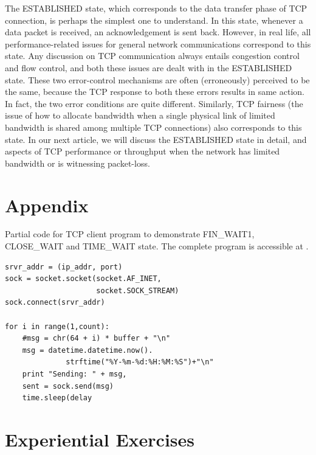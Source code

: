 \begin{multicols}{2}
The ESTABLISHED state, which corresponds to the data transfer phase of TCP connection, is perhaps the simplest one to understand. In this state, whenever a data packet is received, an acknowledgement is sent back. However, in real life, all performance-related issues for general network communications correspond to this state. Any discussion on TCP communication always entails congestion control and flow control, and both these issues are dealt with in the ESTABLISHED state. These two error-control mechanisms are often (erroneously) perceived to be the same, because the TCP response to both these errors results in same action. In fact, the two error conditions are quite different. Similarly, TCP fairness (the issue of how to allocate bandwidth when a single physical link of limited bandwidth is shared among multiple TCP connections) also corresponds to this state. In our next article, we will discuss the ESTABLISHED state in detail, and aspects of TCP performance or throughput when the network has limited bandwidth or is witnessing packet-loss.

\section{Appendix}

Partial code for TCP client program to demonstrate FIN\_WAIT1, CLOSE\_WAIT and TIME\_WAIT state. The complete program is accessible at \cite{chap3-key10}.
\begin{verbatim}
srvr_addr = (ip_addr, port)
sock = socket.socket(socket.AF_INET, 
                     socket.SOCK_STREAM)
sock.connect(srvr_addr)

for i in range(1,count):
    #msg = chr(64 + i) * buffer + "\n"
    msg = datetime.datetime.now().
	          strftime("%Y-%m-%d:%H:%M:%S")+"\n"
    print "Sending: " + msg,
    sent = sock.send(msg)
    time.sleep(delay
\end{verbatim}

\section{Experiential Exercises}


\end{multicols}
